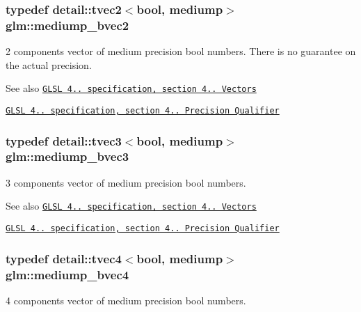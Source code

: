 \subsubsection[{\texorpdfstring{mediump\+\_\+bvec2}{mediump_bvec2}}]{\setlength{\rightskip}{0pt plus 5cm}typedef detail\+::tvec2$<$bool, mediump$>$ {\bf glm\+::mediump\+\_\+bvec2}}\hypertarget{group__core__precision_ga1406d96eb96694d91052d3f882658ab2}{}\label{group__core__precision_ga1406d96eb96694d91052d3f882658ab2}
2 components vector of medium precision bool numbers. There is no guarantee on the actual precision.

\begin{DoxySeeAlso}{See also}
\href{http://www.opengl.org/registry/doc/GLSLangSpec.4.20.8.pdf}{\tt G\+L\+SL 4.. specification, section 4.. Vectors} 

\href{http://www.opengl.org/registry/doc/GLSLangSpec.4.20.8.pdf}{\tt G\+L\+SL 4.. specification, section 4.. Precision Qualifier} 
\end{DoxySeeAlso}
\subsubsection[{\texorpdfstring{mediump\+\_\+bvec3}{mediump_bvec3}}]{\setlength{\rightskip}{0pt plus 5cm}typedef detail\+::tvec3$<$bool, mediump$>$ {\bf glm\+::mediump\+\_\+bvec3}}\hypertarget{group__core__precision_gae7c8d0136e829d6fe3feb00856e35f11}{}\label{group__core__precision_gae7c8d0136e829d6fe3feb00856e35f11}
3 components vector of medium precision bool numbers.

\begin{DoxySeeAlso}{See also}
\href{http://www.opengl.org/registry/doc/GLSLangSpec.4.20.8.pdf}{\tt G\+L\+SL 4.. specification, section 4.. Vectors} 

\href{http://www.opengl.org/registry/doc/GLSLangSpec.4.20.8.pdf}{\tt G\+L\+SL 4.. specification, section 4.. Precision Qualifier} 
\end{DoxySeeAlso}
\subsubsection[{\texorpdfstring{mediump\+\_\+bvec4}{mediump_bvec4}}]{\setlength{\rightskip}{0pt plus 5cm}typedef detail\+::tvec4$<$bool, mediump$>$ {\bf glm\+::mediump\+\_\+bvec4}}\hypertarget{group__core__precision_ga8bb7cfe902e2cb356450d211ca4d58e2}{}\label{group__core__precision_ga8bb7cfe902e2cb356450d211ca4d58e2}
4 components vector of medium precision bool numbers.

